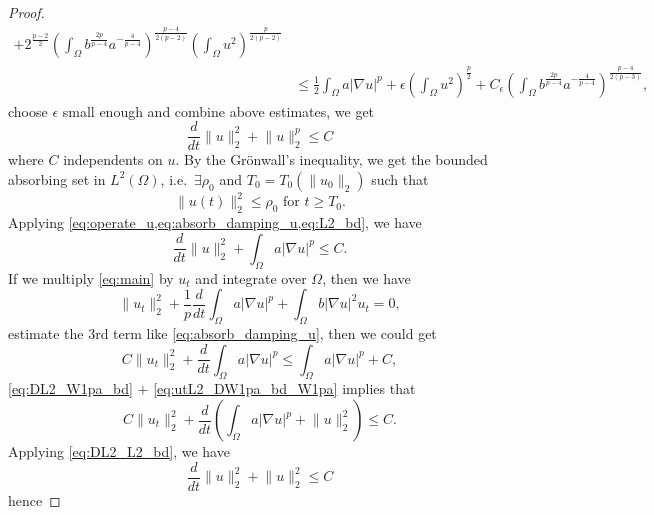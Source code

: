 \documentclass[11pt]{amsart}
\theoremstyle{definition}
\numberwithin{equation}{section}
\newcommand*\abs[1]{\lvert#1\rvert}
\newcommand*\norm[1]{\lVert#1\rVert}
\begin{document}
\begin{proof}
\begin{equation}
\begin{split}
			+ 2^{\frac{p-2}{2}}\left(\int_{\Omega}b^{\frac{2p}{p-4}}a^{-\frac{4}{p-4}}\right)^{\frac{p-4}{2(p-2)}}
			\left(\int_{\Omega}u^2\right)^{\frac{p}{2(p-2)}}\\
			&\leq \frac{1}{2}\int_{\Omega}a\abs{\nabla u}^p
			+ \epsilon \left(\int_{\Omega}u^2\right)^{\frac{p}{2}}
			+ C_{\epsilon}\left(\int_{\Omega}b^{\frac{2p}{p-4}}a^{-\frac{4}{p-4}}\right)^{\frac{p-4}{2(p-3)}},
		\end{split}
	\end{equation}
	choose $\epsilon$ small enough and combine above estimates, we get
	\begin{equation}\label{eq:DL2_L2_bd}
		\frac{d}{dt}\norm{u}_2^2 + \norm{u}_2^p \leq C
	\end{equation}
	where $C$ independents on $u$. By the Gr\"onwall's inequality, we get the
	bounded absorbing set in $L^2(\Omega)$, i.e.\ $\exists \rho_0$ and
	$T_0 = T_0(\norm{u_0}_2)$ such that
	\begin{equation}\label{eq:L2_bd}
		\norm{u(t)}_2^2 \leq \rho_0 \text{ for } t \geq T_0.
	\end{equation}
	Applying \cref{eq:operate_u,eq:absorb_damping_u,eq:L2_bd}, we have
	\begin{equation}\label{eq:DL2_W1pa_bd}
		\frac{d}{dt}\norm{u}_2^2 + \int_{\Omega}a \abs{\nabla u}^p \leq C.
	\end{equation}
	If we multiply \cref{eq:main} by $u_{t}$ and integrate over $\Omega$,
	then we have
	\begin{equation}\label{eq:operate_ut}
		\norm{u_t}_2^2
		+ \frac{1}{p}\frac{d}{dt}\int_{\Omega}a \abs{\nabla u}^p
		+ \int_{\Omega}b \abs{\nabla u}^2 u_t
		= 0,
	\end{equation}
	estimate the 3rd term like \cref{eq:absorb_damping_u}, then we could get
	\begin{equation}\label{eq:utL2_DW1pa_bd_W1pa}
		C\norm{u_t}_2^2
		+ \frac{d}{dt}\int_{\Omega}a \abs{\nabla u}^p
		\leq \int_{\Omega}a \abs{\nabla u}^p
		+ C,
	\end{equation}
	\cref{eq:DL2_W1pa_bd} $+$ \cref{eq:utL2_DW1pa_bd_W1pa} implies that
	\begin{equation}\label{eq:utL2_DW1pa_DL2}
		C\norm{u_t}_2^2
		+ \frac{d}{dt}\left(\int_{\Omega}a \abs{\nabla u}^p
		+ \norm{u}_2^2\right)
		\leq C.
	\end{equation}
	Applying \cref{eq:DL2_L2_bd}, we have
	\begin{equation}
		\frac{d}{dt}\norm{u}_2^2 + \norm{u}_2^2 \leq C
	\end{equation}
	hence

\end{proof}
\end{document}
